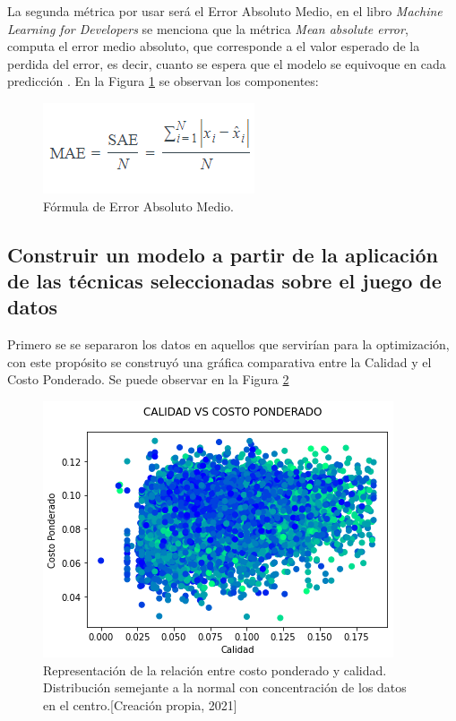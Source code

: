 \documentclass{article}
\begin{document}
La segunda métrica por usar será el Error Absoluto Medio, en el libro \emph{Machine Learning for Developers} se menciona que la métrica \emph{Mean absolute error}, computa el error medio absoluto, que corresponde a el valor esperado de la perdida del error, es decir, cuanto se espera que el modelo se equivoque en cada predicción \cite{mlfd}. En la Figura \ref{fig:MAE} se observan los componentes:

\begin{figure}[h!]
    \centering
    \includegraphics[scale=.7]{F4/F4-MAE.PNG}
    \caption{Fórmula de Error Absoluto Medio.\cite{MAECita}}
    \label{fig:MAE}
\end{figure}

\subsection{Construir un modelo a partir de la aplicación de las técnicas seleccionadas sobre el juego de datos}\label{apto}

Primero se se separaron los datos en aquellos que servirían para la optimización, con este propósito se construyó una gráfica comparativa entre la Calidad y el Costo Ponderado. Se puede observar en la Figura \ref{fig:costo_calidad}

\begin{figure}[h!]
    \centering
    \includegraphics[scale=.7]{F4/F4-im1.PNG}
    \caption{Representación de la relación entre costo ponderado y calidad. Distribución semejante a la normal con concentración de los datos en el centro.[Creación propia, 2021]}
    \label{fig:costo_calidad}
\end{figure}
\end{document}
